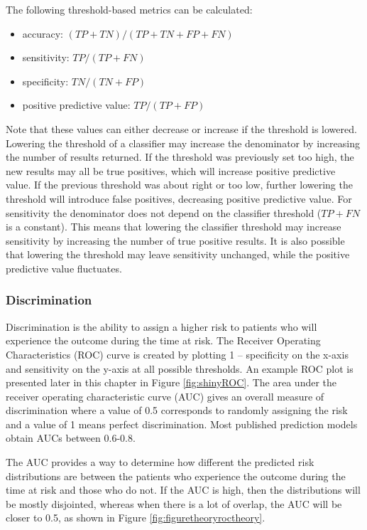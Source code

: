 \documentclass[11pt]{book}
\providecommand{\tightlist}{%
  \setlength{\itemsep}{0pt}\setlength{\parskip}{0pt}}
\theoremstyle{definition}
\theoremstyle{definition}
\theoremstyle{definition}
\theoremstyle{remark}
\begin{document}
The following threshold-based metrics can be calculated:

\begin{itemize}
\tightlist
\item
  accuracy: \((TP+TN)/(TP+TN+FP+FN)\)
\item
  sensitivity: \(TP/(TP+FN)\)
\item
  specificity: \(TN/(TN+FP)\)
\item
  positive predictive value: \(TP/(TP+FP)\)
\end{itemize}

Note that these values can either decrease or increase if the threshold
is lowered. Lowering the threshold of a classifier may increase the
denominator by increasing the number of results returned. If the
threshold was previously set too high, the new results may all be true
positives, which will increase positive predictive value. If the
previous threshold was about right or too low, further lowering the
threshold will introduce false positives, decreasing positive predictive
value. For sensitivity the denominator does not depend on the classifier
threshold (\(TP+FN\) is a constant). This means that lowering the
classifier threshold may increase sensitivity by increasing the number
of true positive results. It is also possible that lowering the
threshold may leave sensitivity unchanged, while the positive predictive
value fluctuates.

\subsubsection*{Discrimination}\label{discrimination}

Discrimination is the ability to assign a higher risk to patients who
will experience the outcome during the time at risk. The Receiver
Operating Characteristics (ROC) curve is created by plotting 1 --
specificity on the x-axis and sensitivity on the y-axis at all possible
thresholds. An example ROC plot is presented later in this chapter in
Figure \ref{fig:shinyROC}. The area under the receiver operating
characteristic curve (AUC) gives an overall measure of discrimination
where a value of 0.5 corresponds to randomly assigning the risk and a
value of 1 means perfect discrimination. Most published prediction
models obtain AUCs between 0.6-0.8.  

The AUC provides a way to determine how different the predicted risk
distributions are between the patients who experience the outcome during
the time at risk and those who do not. If the AUC is high, then the
distributions will be mostly disjointed, whereas when there is a lot of
overlap, the AUC will be closer to 0.5, as shown in Figure
\ref{fig:figuretheoryroctheory}.
\end{document}
